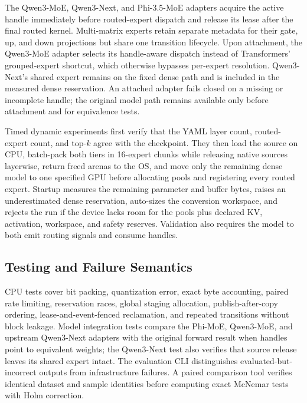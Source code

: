 The Qwen3-MoE, Qwen3-Next, and Phi-3.5-MoE adapters acquire the active handle immediately before routed-expert dispatch and release its lease after the final routed kernel. Multi-matrix experts retain separate metadata for their gate, up, and down projections but share one transition lifecycle. Upon attachment, the Qwen3-MoE adapter selects its handle-aware dispatch instead of Transformers' grouped-expert shortcut, which otherwise bypasses per-expert resolution. Qwen3-Next's shared expert remains on the fixed dense path and is included in the measured dense reservation. An attached adapter fails closed on a missing or incomplete handle; the original model path remains available only before attachment and for equivalence tests.

Timed dynamic experiments first verify that the YAML layer count, routed-expert count, and top-$k$ agree with the checkpoint. They then load the source on CPU, batch-pack both tiers in 16-expert chunks while releasing native sources layerwise, return freed arenas to the OS, and move only the remaining dense model to one specified GPU before allocating pools and registering every routed expert. Startup measures the remaining parameter and buffer bytes, raises an underestimated dense reservation, auto-sizes the conversion workspace, and rejects the run if the device lacks room for the pools plus declared KV, activation, workspace, and safety reserves. Validation also requires the model to both emit routing signals and consume handles.

\subsection{Testing and Failure Semantics}

CPU tests cover bit packing, quantization error, exact byte accounting, paired rate limiting, reservation races, global staging allocation, publish-after-copy ordering, lease-and-event-fenced reclamation, and repeated transitions without block leakage. Model integration tests compare the Phi-MoE, Qwen3-MoE, and upstream Qwen3-Next adapters with the original forward result when handles point to equivalent weights; the Qwen3-Next test also verifies that source release leaves its shared expert intact. The evaluation CLI distinguishes evaluated-but-incorrect outputs from infrastructure failures. A paired comparison tool verifies identical dataset and sample identities before computing exact McNemar tests with Holm correction.

